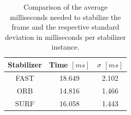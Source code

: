 \begin{table}
    \begin{center}
      \begin{tabular}{ | c | c | c | }
        \hline
        Stabilizer & Time $[ms]$ & $\sigma$ $[ms]$ \\
        \hline
        FAST & 18.649 & 2.102 \\
        ORB  & 14.816 & 1.466 \\
        SURF & 16.058 & 1.443 \\
        \hline
      \end{tabular}
    \end{center}
    \caption{
        Comparison of the average milliseconds needed to stabilize the frame and the respective standard deviation in milliseconds per stabilizer instance.
    }
    \label{tab:dynamic_stabilization_speeds}
  \end{table}

  \newpage